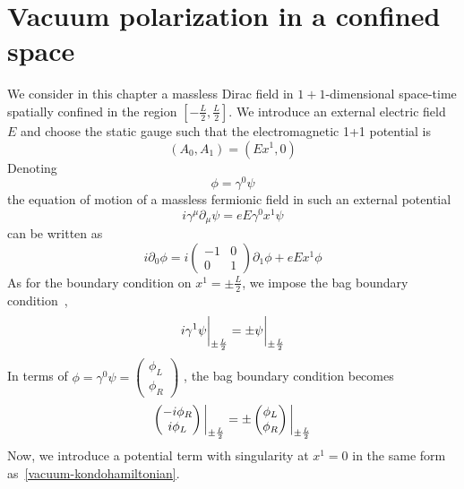 \section{Vacuum polarization in a confined space}\label{sect-nef}
We consider in this chapter a massless Dirac field in $1+1$-dimensional space-time spatially confined in the region $[-\frac L 2 , \frac L 2 ]$.
We introduce an external electric field $E$ and choose the static gauge such that the electromagnetic 1+1 potential is
\begin{equation*}
(A_0, A_1) = (E x^1, 0)
\end{equation*}
Denoting 
\begin{equation*}
\phi = \gamma^0\psi
\end{equation*} 
the equation of motion of a massless fermionic field in such an external potential 
\begin{equation*}
i\gamma^\mu\partial_\mu \psi = eE\gamma^0 x^1 \psi
\end{equation*}
can be written as
\begin{equation*}
i\partial_0\phi = i \begin{pmatrix} -1 & 0 \\ 0 & 1 \end{pmatrix}\partial_1\phi
+ eEx^1\phi
\end{equation*}
%
As for the boundary condition on $x^1 = \pm \frac L 2$, we impose the bag boundary condition~\cite{Chodos1974}, \ie 
\begin{equation*}
i\gamma^1 \psi \bigg\rvert_{\pm \frac{L}{2}} = \pm \psi \bigg\rvert_{\pm \frac{L}{2}}
\end{equation*}
In terms of $\phi = \gamma^0\psi = \begin{pmatrix} \phi_L \\ \phi_R \end{pmatrix}$
, the bag boundary condition becomes
\begin{equation}\label{vacuum-bagboundcond}
\begin{pmatrix}
-i \phi_R \\
i \phi_L
\end{pmatrix} \bigg\rvert_{\pm \frac{L}{2}} = \pm \begin{pmatrix}
\phi_L \\
\phi_R
\end{pmatrix} \bigg\rvert_{\pm \frac{L}{2}}
\end{equation}
%
Now, we introduce a potential term with singularity at $x^1 = 0$ in the same form as~\cref{vacuum-kondohamiltonian}.
